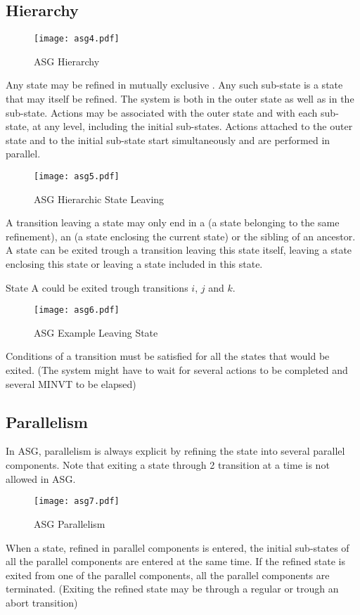 \documentclass[../main.tex]{subfiles}
\begin{document}
\subsection{Hierarchy}
\begin{figure}[H]
    \centering
    \texttt{[image: asg4.pdf]}
    \caption{ASG Hierarchy}
    \label{asg4}
\end{figure}
Any state may be refined in mutually exclusive .
Any such sub-state is a state that may itself be refined.
The system is both in the outer state as well as in the sub-state.
Actions may be associated with the outer state and with each sub-state, at any level, including the initial sub-states.
Actions attached to the outer state and to the initial sub-state start simultaneously and are performed in parallel.
\begin{figure}[H]
    \centering
    \texttt{[image: asg5.pdf]}
    \caption{ASG Hierarchic State Leaving}
    \label{asg5}
\end{figure}
A transition leaving a state may only end in a  (a state belonging to the same refinement), an  (a state enclosing the current state) or the sibling of an ancestor.
A state can be exited trough a transition leaving this state itself, leaving a state enclosing this state or leaving a state included in this state.
\begin{exmp}
State A could be exited trough transitions $i$, $j$ and $k$.
\begin{figure}[H]
    \centering
    \texttt{[image: asg6.pdf]}
    \caption{ASG Example Leaving State}
    \label{asg6}
\end{figure}
\end{exmp}
Conditions of a transition must be satisfied for all the states that would be exited.
(The system might have to wait for several actions to be completed and several MINVT to be elapsed)

\subsection{Parallelism}
In ASG, parallelism is always explicit by refining the state into several parallel components. Note that exiting a state through 2 transition at a time is not allowed in ASG.

\begin{figure}[H]
    \centering
    \texttt{[image: asg7.pdf]}
    \caption{ASG Parallelism}
    \label{asg7}
\end{figure}
When a state, refined in parallel components is entered, the initial sub-states of all the parallel components are entered at the same time.
If the refined state is exited from one of the parallel components, all the parallel components are terminated.
(Exiting the refined state may be through a regular or trough an abort transition)
\end{document}
